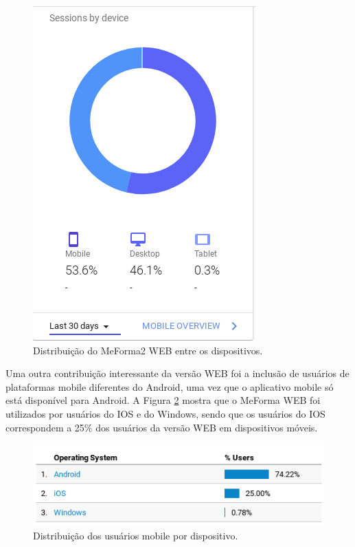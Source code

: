 \begin{figure}[H]
	   \centering
	   		\includegraphics[scale=0.65]{pics/c5/4-sessions.png}
	   \caption{Distribuição do MeForma2 WEB entre os dispositivos.}
	   \label{sessions}
\end{figure}

Uma outra contribuição interessante da versão WEB foi a inclusão de usuários de plataformas mobile diferentes do Android, uma vez que o aplicativo mobile só está disponível para Android. A Figura \ref{mobiles} mostra que o MeForma WEB foi utilizados por usuários do IOS e do Windows, sendo que os usuários do IOS correspondem a 25\% dos usuários da versão WEB em dispositivos móveis.

\begin{figure}[H]
	   \centering
	   		\includegraphics[scale=0.75]{pics/c5/7-mobiles.png}
	   \caption{Distribuição dos usuários mobile por dispositivo.}
	   \label{mobiles}
\end{figure}

